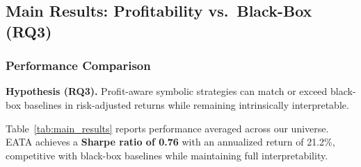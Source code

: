 \documentclass{elektr}
\theoremstyle{corollary}
\theoremstyle{lemma}
\theoremstyle{proposition}
\theoremstyle{axiom}
\theoremstyle{conjecture}
\theoremstyle{example}
\theoremstyle{definition}
\theoremstyle{remark}
\begin{document}
\subsection{Main Results: Profitability vs.\ Black-Box (RQ3)}

\subsubsection{Performance Comparison}
\textbf{Hypothesis (RQ3).} Profit-aware symbolic strategies can match or exceed black-box baselines in risk-adjusted returns while remaining intrinsically interpretable.

Table~\ref{tab:main_results} reports performance averaged across our universe. EATA achieves a \textbf{Sharpe ratio of 0.76} with an annualized return of 21.2\%, competitive with black-box baselines while maintaining full interpretability.

\begin{table}[htbp]
\centering
\caption{Main Performance Comparison. EATA achieves competitive Sharpe Ratio while maintaining interpretability.}
\label{tab:main_results}

\end{table}
\end{document}
